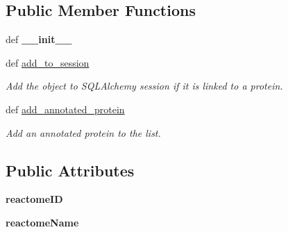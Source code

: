 \subsection*{Public Member Functions}
\begin{DoxyCompactItemize}
\item 
\hypertarget{classsrc_1_1fr_1_1tagc_1_1rainet_1_1core_1_1data_1_1ReactomePathway_1_1ReactomePathway_ab1443eba79a8b3a0f7e847095b3d0efa}{def {\bfseries \-\_\-\-\_\-init\-\_\-\-\_\-}}\label{classsrc_1_1fr_1_1tagc_1_1rainet_1_1core_1_1data_1_1ReactomePathway_1_1ReactomePathway_ab1443eba79a8b3a0f7e847095b3d0efa}

\item 
\hypertarget{classsrc_1_1fr_1_1tagc_1_1rainet_1_1core_1_1data_1_1ReactomePathway_1_1ReactomePathway_a27cc45d5998e3c89d4d0c33460a1053f}{def \hyperlink{classsrc_1_1fr_1_1tagc_1_1rainet_1_1core_1_1data_1_1ReactomePathway_1_1ReactomePathway_a27cc45d5998e3c89d4d0c33460a1053f}{add\-\_\-to\-\_\-session}}\label{classsrc_1_1fr_1_1tagc_1_1rainet_1_1core_1_1data_1_1ReactomePathway_1_1ReactomePathway_a27cc45d5998e3c89d4d0c33460a1053f}

\begin{DoxyCompactList}\small\item\em Add the object to S\-Q\-L\-Alchemy session if it is linked to a protein. \end{DoxyCompactList}\item 
\hypertarget{classsrc_1_1fr_1_1tagc_1_1rainet_1_1core_1_1data_1_1ReactomePathway_1_1ReactomePathway_a058331ca6a9d475abce8cd1316f3b7d4}{def \hyperlink{classsrc_1_1fr_1_1tagc_1_1rainet_1_1core_1_1data_1_1ReactomePathway_1_1ReactomePathway_a058331ca6a9d475abce8cd1316f3b7d4}{add\-\_\-annotated\-\_\-protein}}\label{classsrc_1_1fr_1_1tagc_1_1rainet_1_1core_1_1data_1_1ReactomePathway_1_1ReactomePathway_a058331ca6a9d475abce8cd1316f3b7d4}

\begin{DoxyCompactList}\small\item\em Add an annotated protein to the list. \end{DoxyCompactList}\end{DoxyCompactItemize}
\subsection*{Public Attributes}
\begin{DoxyCompactItemize}
\item 
\hypertarget{classsrc_1_1fr_1_1tagc_1_1rainet_1_1core_1_1data_1_1ReactomePathway_1_1ReactomePathway_a131f7278bbbab83f78570e92842370a5}{{\bfseries reactome\-I\-D}}\label{classsrc_1_1fr_1_1tagc_1_1rainet_1_1core_1_1data_1_1ReactomePathway_1_1ReactomePathway_a131f7278bbbab83f78570e92842370a5}

\item 
\hypertarget{classsrc_1_1fr_1_1tagc_1_1rainet_1_1core_1_1data_1_1ReactomePathway_1_1ReactomePathway_a7c750adf5f1b03344c5bdb0d1aaf3d79}{{\bfseries reactome\-Name}}\label{classsrc_1_1fr_1_1tagc_1_1rainet_1_1core_1_1data_1_1ReactomePathway_1_1ReactomePathway_a7c750adf5f1b03344c5bdb0d1aaf3d79}

\end{DoxyCompactItemize}
